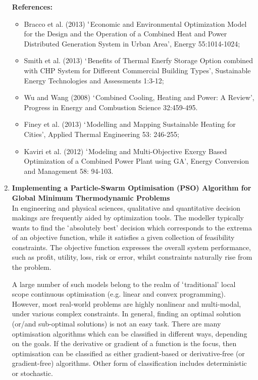 \documentclass[12pts,a4paper,amsmath,amssymb,floatfix]{article}%
\begin{document}
\begin{enumerate}[label=\bfseries Project: \arabic*:]
\noindent
{\bf References:}
\begin{itemize}
\item Bracco et al. (2013) $\lq$Economic and Environmental Optimization Model for the Design and the Operation of a Combined Heat and Power Distributed Generation System in Urban Area’, Energy 55:1014-1024;
\item Smith et al. (2013) $\lq$Benefits of Thermal Enerfy Storage Option combined with CHP System for Different Commercial Building Types’, Sustainable Energy Technologies and Assessments 1:3-12;
\item Wu and Wang (2008) $\lq$Combined Cooling, Heating and Power: A Review’, Progress in Energy and Combustion Science 32:459-495.
\item Finey et al. (2013) $\lq$Modelling and Mapping Sustainable Heating for Cities’, Applied Thermal Engineering 53: 246-255;
\item Kaviri et al. (2012) $\lq$Modeling and Multi-Objective Exergy Based Optimization of a Combined Power Plant using GA’, Energy Conversion and Management 58: 94-103.
\end{itemize}

\clearpage

\item {\bf Implementing a Particle-Swarm Optimisation (PSO) Algorithm for Global Minimum Thermodynamic Problems} \\

In engineering and physical sciences, qualitative and quantitative decision makings are frequently aided by optimization tools. The modeller typically wants to find the $\lq$absolutely best’ decision which corresponds to the extrema of an objective function, while it satisfies a given collection of feasibility constraints. The objective function expresses the overall system performance, such as profit, utility, loss, risk or error, whilst constraints naturally rise from the problem.

A large number of such models belong to the realm of $\lq$traditional' local scope continuous optimisation (e.g. linear and convex programming). However, most real-world problems are highly nonlinear and multi-modal, under various complex constraints. In general, finding an optimal solution (or/and sub-optimal solutions) is not an easy task. There are many optimisation algorithms which can be classified in different ways, depending on the goals. If the derivative or gradient of a function is the focus, then optimisation can be classified as either gradient-based or derivative-free (or gradient-free) algorithms. Other form of classification includes deterministic or stochastic.


\end{enumerate}
\end{document}
